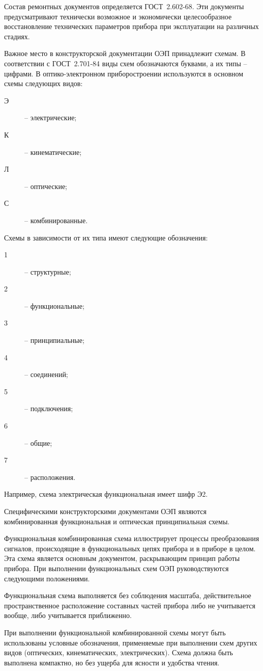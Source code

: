 Состав ремонтных документов определяется ГОСТ~2.602-68. Эти документы предусматривают технически возможное и экономически целесообразное восстановление технических параметров прибора при эксплуатации на различных стадиях.

Важное место в конструкторской документации ОЭП принадлежит схемам. В соответствии с ГОСТ~2.701-84 виды схем обозначаются буквами, а их типы -- цифрами. В оптико-электронном приборостроении используются в основном схемы следующих видов:
\begin{description}
	\item[Э] -- электрические;
	\item[К] -- кинематические;
	\item[Л] -- оптические;
	\item[С] -- комбинированные.
\end{description}

Схемы в зависимости от их типа имеют следующие обозначения:
\begin{description}
	\item[1] -- структурные;
	\item[2] -- функциональные;
	\item[3] -- принципиальные;
	\item[4] -- соединений;
	\item[5] -- подключения;
	\item[6] -- общие;
	\item[7] -- расположения.
\end{description}

Например, схема электрическая функциональная имеет шифр Э2.

Специфическими конструкторскими документами ОЭП являются комбинированная функциональная и оптическая принципиальная схемы.

Функциональная комбинированная схема иллюстрирует процессы преобразования сигналов, происходящие в функциональных цепях прибора и в приборе в целом. Эта схема является основным документом, раскрывающим принцип работы прибора. При выполнении функциональных схем ОЭП руководствуются следующими положениями.

Функциональная схема выполняется без соблюдения масштаба, действительное пространственное расположение составных частей прибора либо не учитывается вообще, либо учитывается приближенно.

При выполнении функциональной комбинированной схемы могут быть использованы условные обозначения, применяемые при выполнении схем других видов (оптических, кинематических, электрических). Схема должна быть выполнена компактно, но без ущерба для ясности и удобства чтения.

